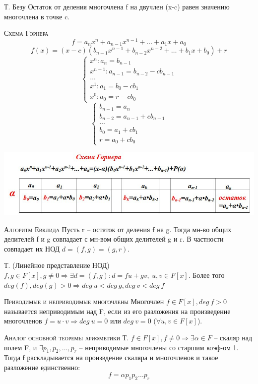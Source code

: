 \documentclass{article}
\begin{document}
Т. Безу Остаток от деления многочлена f на двучлен (x-c) равен значению многочлена в точке c.

\textsc{Схема Горнера}
$$f=a_nx^n+a_{n-1}x^{n-1}+\dots+a_1x+a_0$$
$$f(x)=(x-c)(b_{n-1}x^{n-1}+b_{n-2}x^{n-2}+\dots+b_1x+b_0)+r$$
\begin{equation*}
    \begin{cases}
        x^n: a_n=b_{n-1} \\
        x^{n-1}: a_{n-1}=b_{n-2}-cb_{n-1} \\
        \dots \\
        x^1: a_1=b_0-cb_1 \\
        x^0: a_0=r-cb_0
    \end{cases}
\end{equation*}
\begin{equation*}
    \begin{cases}
        b_{n-1}=a_n \\
        b_{n-2}=a_{n-1}+cb_{n-1} \\
        \dots \\
        b_0=a_1+cb_1 \\
        r=a_0+cb_0
    \end{cases}
\end{equation*}

\centerline{\includegraphics[width=0.7\linewidth]{gr62.jpeg}}

\textsc{Алгоритм Евклида}
Пусть r – остаток от деления f на g. Тогда мн-во общих делителей f и g совпадает с мн-вом общих делителей g и r. В частности совпадает их НОД $d=(f,g)=(g,r)$.

Т. (Линейное представление НОД) $f, g\in F[x], g\neq 0\Rightarrow\exists d=(f,g)\colon d=fu+gv,\ u,v\in F[x]$. Более того $deg(f), deg(g)>0\Rightarrow deg\ u<deg\ g, deg\ v<deg\ f$

\textsc{Приводимые и неприводимые многочлены}
Многочлен $f\in F[x], deg\ f>0$ называется неприводимым над F, если из его разложения на произведение многочленов $f=u\cdot v\Rightarrow deg\ u=0$ или $deg\ v=0$ ($\forall u,v\in F[x]$).

\textsc{Аналог основной теоремы арифметики}
Т. $f\in F[x], f\neq 0\Rightarrow\exists\alpha\in F$ – скаляр над полем F, и $\exists p_1,p_2,\dots,p_r$ – неприводимые многочлены со старшим коэф-ом 1. Тогда f раскладывается на произвдение скаляра и многочленов и такое разложение единственно:
$$f=\alpha p_1p_2\dots p_r$$
\end{document}
